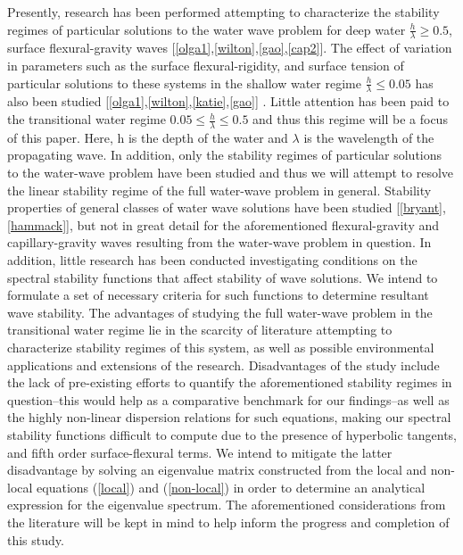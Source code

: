 \documentclass{article}
\begin{document}
Presently, research has been performed attempting to characterize the stability regimes of particular solutions to the water wave problem for deep water \(\frac{h}{\lambda} \geq 0.5\), surface flexural-gravity waves [\ref{olga1},\ref{wilton},\ref{gao},\ref{cap2}]. The effect of variation in parameters such as the surface flexural-rigidity, and surface tension of particular solutions to these systems in the shallow water regime \(\frac{h}{\lambda} \leq 0.05\) has also been studied [\ref{olga1},\ref{wilton},\ref{katie},\ref{gao}] . Little attention has been paid to the transitional water regime \(0.05 \leq \frac{h}{\lambda} \leq 0.5\) and thus this regime will be a focus of this paper. Here, h is the depth of the water and \(\lambda\) is the wavelength of the propagating wave. In addition, only the stability regimes of particular solutions to the water-wave problem have been studied and thus we will attempt to resolve the linear stability regime of the full water-wave problem in general. Stability properties of general classes of water wave solutions have been studied [\ref{bryant},\ref{hammack}], but not in great detail for the aforementioned flexural-gravity and capillary-gravity waves resulting from the water-wave problem in question. In addition, little research has been conducted investigating conditions on the spectral stability functions that affect stability of wave solutions. We intend to formulate a set of necessary criteria for such functions to determine resultant wave stability. The advantages of studying the full water-wave problem in the transitional water regime lie in the scarcity of literature attempting to characterize stability regimes of this system, as well as possible environmental applications and extensions of the research. Disadvantages of the study include the lack of pre-existing efforts to quantify the aforementioned stability regimes in question--this would help as a comparative benchmark for our findings--as well as the highly non-linear dispersion relations for such equations, making our spectral stability functions difficult to compute due to the presence of hyperbolic tangents, and fifth order surface-flexural terms. We intend to mitigate the latter disadvantage by solving an eigenvalue matrix constructed from the local and non-local equations (\ref{local}) and (\ref{non-local}) in order to determine an analytical expression for the eigenvalue spectrum. The aforementioned considerations from the literature will be kept in mind to help inform the progress and completion of this study. \\
\end{document}
